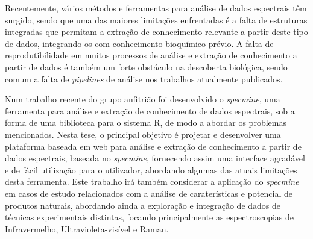 Recentemente, vários métodos e ferramentas para análise de dados espectrais têm surgido, sendo que uma das maiores limitações enfrentadas é a falta de estruturas integradas que permitam a extração de conhecimento relevante a partir deste tipo de dados, integrando-os com conhecimento bioquímico prévio. A falta de reprodutibilidade em muitos processos de análise e extração de conhecimento a partir de dados é também um forte obstáculo na descoberta biológica, sendo comum a falta de \textit{pipelines} de análise nos trabalhos atualmente publicados.

Num trabalho recente do grupo anfitrião foi desenvolvido o \textit{specmine}, uma ferramenta para análise e extração de conhecimento de dados espectrais, sob a forma de uma biblioteca para o sistema R, de modo a abordar os problemas mencionados. Nesta tese, o principal objetivo é projetar e desenvolver uma plataforma baseada em web para análise e extração de conhecimento a partir de dados espectrais, baseada no \textit{specmine}, fornecendo assim uma interface agradável e de fácil utilização para o utilizador, abordando algumas das atuais limitações desta ferramenta. Este trabalho irá também considerar a aplicação do \textit{specmine} em casos de estudo relacionados com a análise de caraterísticas e potencial de produtos naturais, abordando ainda a exploração e integração de dados de técnicas experimentais distintas, focando principalmente as espectroscopias de Infravermelho, Ultravioleta-visível e Raman.



